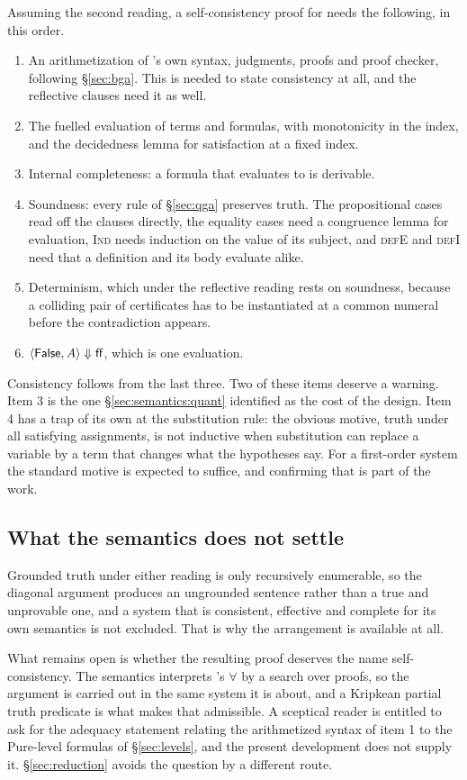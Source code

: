 Assuming the second reading, a self-consistency proof for \QGA{} needs the
following, in this order.

\begin{enumerate}
\item An arithmetization of \QGA's own syntax, judgments, proofs and proof
      checker, following \S\ref{sec:bga}.  This is needed to state consistency at
      all, and the reflective clauses need it as well.
\item The fuelled evaluation of terms and formulas, with monotonicity in the
      index, and the decidedness lemma for satisfaction at a fixed index.
\item Internal completeness: a formula that evaluates to  is derivable.
\item Soundness: every rule of \S\ref{sec:qga} preserves truth.  The propositional
      cases read off the clauses directly, the equality cases need a congruence
      lemma for evaluation, \textsc{Ind} needs induction on the value of its
      subject, and \textsc{defE} and \textsc{defI} need that a definition and its
      body evaluate alike.
\item Determinism, which under the reflective reading rests on soundness, because
      a colliding pair of certificates has to be instantiated at a common numeral
      before the contradiction appears.
\item $\langle \mathsf{False}, A\rangle \Downarrow \mathsf{ff}$, which is one evaluation.
\end{enumerate}

\noindent
Consistency follows from the last three.  Two of these items deserve a warning.
Item 3 is the one \S\ref{sec:semantics:quant} identified as the cost of the
design.  Item 4 has a trap of its own at the substitution rule: the obvious
motive, truth under all satisfying assignments, is not inductive when
substitution can replace a variable by a term that changes what the hypotheses
say.  For a first-order system the standard motive is expected to suffice, and
confirming that is part of the work.

\subsection{What the semantics does not settle}

Grounded truth under either reading is only recursively enumerable, so the
diagonal argument produces an ungrounded sentence rather than a true and
unprovable one, and a system that is consistent, effective and complete for its
own semantics is not excluded.  That is why the arrangement is available at all.

What remains open is whether the resulting proof deserves the name
self-consistency.  The semantics interprets \QGA's $\forall$ by a search over
\QGA{} proofs, so the argument is carried out in the same system it is about, and
a Kripkean partial truth predicate is what makes that admissible.  A sceptical
reader is entitled to ask for the adequacy statement relating the arithmetized
syntax of item 1 to the Pure-level formulas of \S\ref{sec:levels}, and the
present development does not supply it.  \S\ref{sec:reduction} avoids the
question by a different route.
